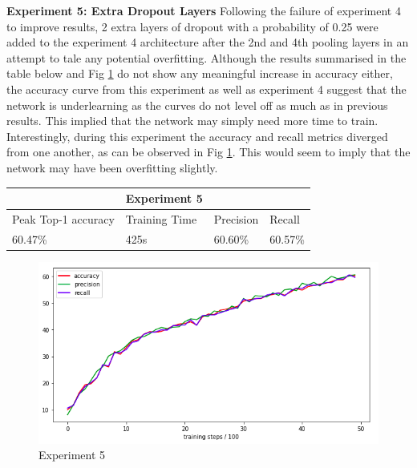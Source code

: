 \documentclass[12pt]{report}
\begin{document}
\newpage
\begin{flushleft}
\vspace{0.5cm}
\textbf{Experiment 5: Extra Dropout Layers}
\linebreak
Following the failure of experiment 4 to improve results, 2 extra layers of dropout with a probability of 0.25 were added to the experiment 4 architecture after the 2nd and 4th pooling layers in an attempt to tale any potential overfitting. Although the results summarised in the table below and Fig \ref{fig:experiment-5} do not show any meaningful increase in accuracy either, the accuracy curve from this experiment as well as experiment 4 suggest that the network is underlearning as the curves do not level off as much as in previous results. This implied that the network may simply need more time to train. Interestingly, during this experiment the accuracy and recall metrics diverged from one another, as can be observed in Fig \ref{fig:experiment-5}. This would seem to imply that the network may have been overfitting slightly.

\vspace{0.5cm}
\begin{tabular}{llll}
                                          & \multicolumn{1}{c}{Experiment 5}   &                                &                              \\ \hline
\multicolumn{1}{|l|}{Peak Top-1 accuracy} & \multicolumn{1}{l|}{Training Time} & \multicolumn{1}{l|}{Precision} & \multicolumn{1}{l|}{Recall}  \\ \hline
\multicolumn{1}{|l|}{60.47\%}             & \multicolumn{1}{l|}{425s}          & \multicolumn{1}{l|}{60.60\%}   & \multicolumn{1}{l|}{60.57\%} \\ \hline
\end{tabular}

\vspace{0.5cm}
\begin{figure}[ht!]
	\centering
	\includegraphics[width=12cm]{experiment-5}
	\caption{Experiment 5}
	\label{fig:experiment-5}
\end{figure}
\end{flushleft}
\end{document}
